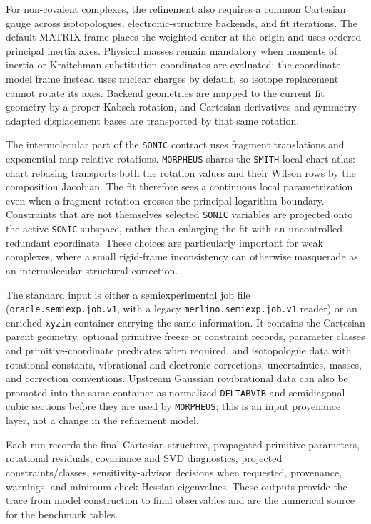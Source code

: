 \documentclass[aip,jcp,reprint,longbibliography,floatfix]{revtex4-2}
\begin{document}
For non-covalent complexes, the refinement also requires a common Cartesian
gauge across isotopologues, electronic-structure backends, and fit iterations.
The default MATRIX frame places the weighted center at the origin and uses
ordered principal inertia axes.  Physical masses remain mandatory when moments
of inertia or Kraitchman substitution coordinates are evaluated; the
coordinate-model frame instead uses nuclear charges by default, so isotope
replacement cannot rotate its axes.  Backend geometries are mapped to the
current fit geometry by a proper Kabsch rotation, and Cartesian derivatives and
symmetry-adapted displacement bases are transported by that same rotation.

The intermolecular part of the \texttt{SONIC} contract uses fragment
translations and exponential-map relative rotations.  \texttt{MORPHEUS}
shares the \texttt{SMITH} local-chart atlas: chart rebasing transports both the
rotation values and their Wilson rows by the composition Jacobian.  The fit
therefore sees a continuous local parametrization even when a fragment
rotation crosses the principal logarithm boundary.  Constraints that are not
themselves selected \texttt{SONIC} variables are projected onto the active
\texttt{SONIC} subspace, rather than enlarging the fit with an uncontrolled
redundant coordinate.  These choices are particularly important for weak
complexes, where a small rigid-frame inconsistency can otherwise masquerade as
an intermolecular structural correction.

The standard input is either a semiexperimental job file
(\texttt{oracle.semiexp.job.v1}, with a legacy
\texttt{merlino.semiexp.job.v1} reader) or an enriched \texttt{xyzin}
container carrying the same information. It contains the Cartesian parent
geometry, optional primitive freeze or constraint records, parameter classes
and primitive-coordinate predicates when required, and isotopologue data with
rotational constants, vibrational and electronic corrections, uncertainties,
masses, and correction conventions. Upstream Gaussian rovibrational data can
also be promoted into the same container as normalized \texttt{DELTABVIB} and
semidiagonal-cubic sections before they are used by \texttt{MORPHEUS}; this is
an input provenance layer, not a change in the refinement model.

Each run records the final Cartesian structure, propagated primitive
parameters, rotational residuals, covariance and SVD diagnostics, projected
constraints/classes, sensitivity-advisor decisions when requested, provenance,
warnings, and minimum-check Hessian eigenvalues. These outputs provide the
trace from model construction to final observables and are the numerical
source for the benchmark tables.
\end{document}
